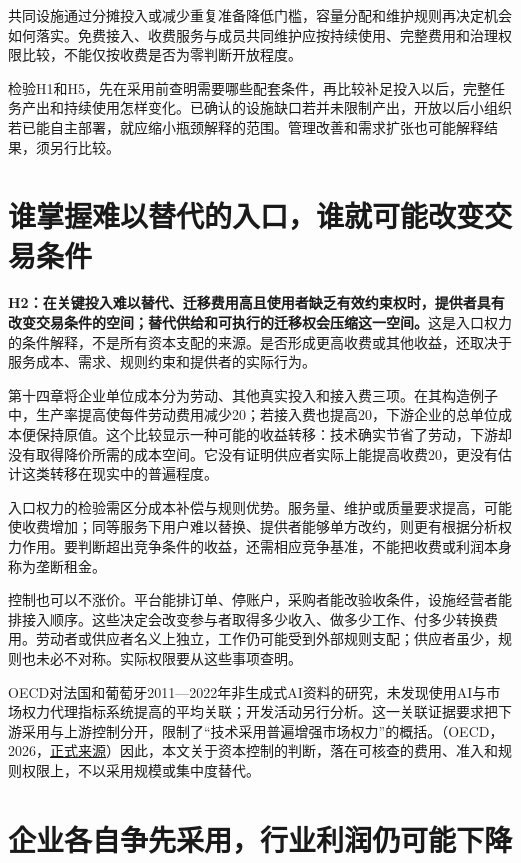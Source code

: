 \documentclass[UTF8,fontset=windows,12pt,a4paper,oneside,openany]{ctexbook}
\begin{document}
共同设施通过分摊投入或减少重复准备降低门槛，容量分配和维护规则再决定机会如何落实。免费接入、收费服务与成员共同维护应按持续使用、完整费用和治理权限比较，不能仅按收费是否为零判断开放程度。

检验H1和H5，先在采用前查明需要哪些配套条件，再比较补足投入以后，完整任务产出和持续使用怎样变化。已确认的设施缺口若并未限制产出，开放以后小组织若已能自主部署，就应缩小瓶颈解释的范围。管理改善和需求扩张也可能解释结果，须另行比较。

\section{谁掌握难以替代的入口，谁就可能改变交易条件}

\textbf{H2：在关键投入难以替代、迁移费用高且使用者缺乏有效约束权时，提供者具有改变交易条件的空间；替代供给和可执行的迁移权会压缩这一空间。}这是入口权力的条件解释，不是所有资本支配的来源。是否形成更高收费或其他收益，还取决于服务成本、需求、规则约束和提供者的实际行为。

第十四章将企业单位成本分为劳动、其他真实投入和接入费三项。在其构造例子中，生产率提高使每件劳动费用减少20；若接入费也提高20，下游企业的总单位成本便保持原值。这个比较显示一种可能的收益转移：技术确实节省了劳动，下游却没有取得降价所需的成本空间。它没有证明供应者实际上能提高收费20，更没有估计这类转移在现实中的普遍程度。

入口权力的检验需区分成本补偿与规则优势。服务量、维护或质量要求提高，可能使收费增加；同等服务下用户难以替换、提供者能够单方改约，则更有根据分析权力作用。要判断超出竞争条件的收益，还需相应竞争基准，不能把收费或利润本身称为垄断租金。

控制也可以不涨价。平台能排订单、停账户，采购者能改验收条件，设施经营者能排接入顺序。这些决定会改变参与者取得多少收入、做多少工作、付多少转换费用。劳动者或供应者名义上独立，工作仍可能受到外部规则支配；供应者虽少，规则也未必不对称。实际权限要从这些事项查明。

OECD对法国和葡萄牙2011—2022年非生成式AI资料的研究，未发现使用AI与市场权力代理指标系统提高的平均关联；开发活动另行分析。这一关联证据要求把下游采用与上游控制分开，限制了“技术采用普遍增强市场权力”的概括。（OECD，2026，\href{https://doi.org/10.1787/6f88a1ea-en}{正式来源}）因此，本文关于资本控制的判断，落在可核查的费用、准入和规则权限上，不以采用规模或集中度替代。

\section{企业各自争先采用，行业利润仍可能下降}
\end{document}

